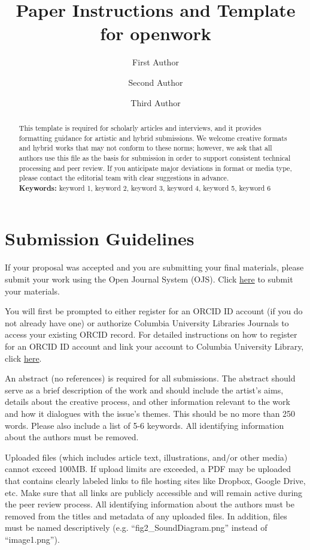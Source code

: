 \documentclass[12pt]{article}
\title{Paper Instructions and Template for openwork}
\author[1,2]{First Author}
\author[2,3]{Second Author}
\author[2]{Third Author}
\affil[1]{First Department, First University, First Country}
\affil[2]{Institute Name, Second Country}
\affil[3]{Third Department, Third Affiliation, Third Country}
\date{}
\begin{document}
\maketitle

\begin{abstract}
This template is required for scholarly articles and interviews, and it provides formatting guidance for artistic and hybrid submissions. We welcome creative formats and hybrid works that may not conform to these norms; however, we ask that all authors use this file as the basis for submission in order to support consistent technical processing and peer review. If you anticipate major deviations in format or media type, please contact the editorial team with clear suggestions in advance. \\
\textbf{Keywords:} keyword 1, keyword 2, keyword 3, keyword 4, keyword 5, keyword 6 
\end{abstract}

\section{Submission Guidelines}

If your proposal was accepted and you are submitting your final materials, please submit your work using the Open Journal System (OJS). Click \href{https://orcid.org/signin?client_id=APP-24WVJE2V6007Z3NV&response_type=code&scope=openid&redirect_uri=https:%2F%2Fjournals.library.columbia.edu%2Findex.php%2Fopenwork%2Fopenid%2FdoAuthentication%3Fprovider%3Dorcid}{here} to submit your materials. 

You will first be prompted to either register for an ORCID ID account (if you do not already have one) or authorize Columbia University Libraries Journals to access your existing ORCID record. For detailed instructions on how to register for an ORCID ID account and link your account to Columbia University Library, click \href{https://journals.library.columbia.edu/public/site/tutorials/OJS-orcid-tutorial.pdf}{here}. 

An abstract (no references) is required for all submissions. The abstract should serve as a brief description of the work and should include the artist's aims, details about the creative process, and other information relevant to the work and how it dialogues with the issue's themes. This should be no more than 250 words. Please also include a list of 5-6 keywords. All identifying information about the authors must be removed. 

Uploaded files (which includes article text, illustrations, and/or other media) cannot exceed 100MB. If upload limits are exceeded, a PDF may be uploaded that contains clearly labeled links to file hosting sites like Dropbox, Google Drive, etc. Make sure that all links are publicly accessible and will remain active during the peer review process. All identifying information about the authors must be removed from the titles and metadata of any uploaded files. In addition, files must be named descriptively (e.g. ``fig2\_SoundDiagram.png'' instead of ``image1.png'').
\end{document}
